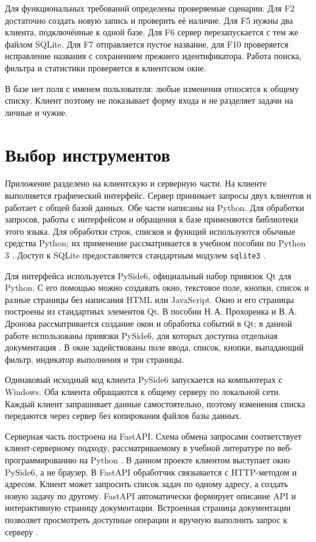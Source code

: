 Для функциональных требований определены проверяемые сценарии. Для F2 достаточно создать новую запись и проверить её наличие. Для F5 нужны два клиента, подключённые к одной базе. Для F6 сервер перезапускается с тем же файлом SQLite. Для F7 отправляется пустое название, для F10 проверяется исправление названия с сохранением прежнего идентификатора. Работа поиска, фильтра и статистики проверяется в клиентском окне.

В базе нет поля с именем пользователя: любые изменения относятся к общему списку. Клиент поэтому не показывает форму входа и не разделяет задачи на личные и чужие.

\section{Выбор инструментов}

Приложение разделено на клиентскую и серверную части. На клиенте выполняется графический интерфейс. Сервер принимает запросы двух клиентов и работает с общей базой данных. Обе части написаны на Python. Для обработки запросов, работы с интерфейсом и обращения к базе применяются библиотеки этого языка. Для обработки строк, списков и функций используются обычные средства Python; их применение рассматривается в учебном пособии по Python 3 \cite{polupanov}. Доступ к SQLite предоставляется стандартным модулем \texttt{sqlite3} \cite{pythonsqlite}.

Для интерфейса используется PySide6, официальный набор привязок Qt для Python. С его помощью можно создавать окно, текстовое поле, кнопки, список и разные страницы без написания HTML или JavaScript. Окно и его страницы построены из стандартных элементов Qt. В пособии Н.\,А. Прохоренка и В.\,А. Дронова рассматривается создание окон и обработка событий в Qt; в данной работе использованы привязки PySide6, для которых доступна отдельная документация \cite{prokhorenok,qtdocs}. В окне задействованы поле ввода, список, кнопки, выпадающий фильтр, индикатор выполнения и три страницы.

Одинаковый исходный код клиента PySide6 запускается на компьютерах с Windows. Оба клиента обращаются к общему серверу по локальной сети. Каждый клиент запрашивает данные самостоятельно, поэтому изменения списка передаются через сервер без копирования файлов базы данных.

Серверная часть построена на FastAPI. Схема обмена запросами соответствует клиент-серверному подходу, рассматриваемому в учебной литературе по веб-программированию на Python \cite{yantsev}. В данном проекте клиентом выступает окно PySide6, а не браузер. В FastAPI обработчик связывается с HTTP-методом и адресом. Клиент может запросить список задач по одному адресу, а создать новую задачу по другому. FastAPI автоматически формирует описание API и интерактивную страницу документации. Встроенная страница документации позволяет просмотреть доступные операции и вручную выполнить запрос к серверу \cite{fastapifirst}.

